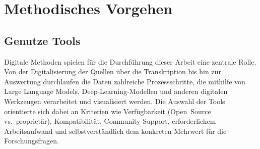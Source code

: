 \documentclass[12pt, a4paper, ngerman, bidi=default]{article}
\begin{document}



\section{Methodisches Vorgehen}
\subsection{Genutze Tools}
Digitale Methoden spielen für die Durchführung dieser Arbeit eine zentrale Rolle. Von der Digitalisierung der Quellen
über die Transkription bis hin zur Auswertung durchlaufen die Daten zahlreiche Prozessschritte, die mithilfe von Large 
Language Models, Deep-Learning-Modellen und anderen digitalen Werkzeugen verarbeitet und visualisiert werden. 
Die Auswahl der Tools orientierte sich dabei an Kriterien wie Verfügbarkeit (Open~Source vs.\ proprietär), 
Kompatibilität, Community-Support, erforderlichem Arbeitsaufwand und selbstverständlich dem konkreten Mehrwert für 
die Forschungsfragen.
\end{document}
